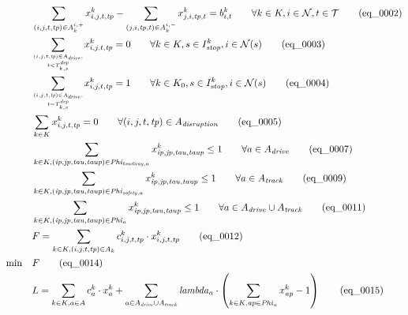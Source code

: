\begin{align}
  & \sum_{(i,j,t,\mathit{tp}) \in A_{k}^{i,+}} x_{i,j,t,\mathit{tp}}^{k} - \sum_{(j,i,\mathit{tp},t) \in A_{k}^{i,-}} x_{j,i,\mathit{tp},t}^{k} = b_{i,t}^{k} \qquad \forall k \in K, i \in \mathcal{N}, t \in \mathcal{T} \tag{eq\_0002} \\
  & \underset{\genfrac{}{}{0pt}{}{(i,j,t,\mathit{tp}) \in A_{\mathit{drive}},}{t < T_{k,s}^{\mathit{dep}}}}{\sum} x_{i,j,t,\mathit{tp}}^{k} = 0 \qquad \forall k \in K, s \in I_{\mathit{stop}}^{k}, i \in \mathcal{N}(s) \tag{eq\_0003} \\
  & \underset{\genfrac{}{}{0pt}{}{(i,j,t,\mathit{tp}) \in A_{\mathit{drive}},}{t = T_{k,s}^{\mathit{dep}}}}{\sum} x_{i,j,t,\mathit{tp}}^{k} = 1 \qquad \forall k \in K_{0}, s \in I_{\mathit{stop}}^{k}, i \in \mathcal{N}(s) \tag{eq\_0004} \\
  & \sum_{k \in K} x_{i,j,t,\mathit{tp}}^{k} = 0 \qquad \forall (i,j,t,\mathit{tp}) \in A_{\mathit{disruption}} \tag{eq\_0005} \\
  & \sum_{k \in K, (\mathit{ip},\mathit{jp},\mathit{tau},\mathit{taup}) \in \mathit{Phi}_{\mathit{headway},a}} x_{\mathit{ip},\mathit{jp},\mathit{tau},\mathit{taup}}^{k} \le 1 \qquad \forall a \in A_{\mathit{drive}} \tag{eq\_0007} \\
  & \sum_{k \in K, (\mathit{ip},\mathit{jp},\mathit{tau},\mathit{taup}) \in \mathit{Phi}_{\mathit{safety},a}} x_{\mathit{ip},\mathit{jp},\mathit{tau},\mathit{taup}}^{k} \le 1 \qquad \forall a \in A_{\mathit{track}} \tag{eq\_0009} \\
  & \sum_{k \in K, (\mathit{ip},\mathit{jp},\mathit{tau},\mathit{taup}) \in \mathit{Phi}_{a}} x_{\mathit{ip},\mathit{jp},\mathit{tau},\mathit{taup}}^{k} \le 1 \qquad \forall a \in A_{\mathit{drive}} \cup A_{\mathit{track}} \tag{eq\_0011} \\
  & F = \sum_{k \in K, (i,j,t,\mathit{tp}) \in A_{k}} c_{i,j,t,\mathit{tp}}^{k} \cdot x_{i,j,t,\mathit{tp}}^{k} \tag{eq\_0012} \\
  \min\quad & F \tag{eq\_0014} \\
  & L = \sum_{k \in K, a \in A} c_{a}^{k} \cdot x_{a}^{k} + \sum_{a \in A_{\mathit{drive}} \cup A_{\mathit{track}}} \mathit{lambda}_{a} \cdot \left( \sum_{k \in K, \mathit{ap} \in \mathit{Phi}_{a}} x_{\mathit{ap}}^{k} - 1 \right) \tag{eq\_0015} \\

\end{align}

